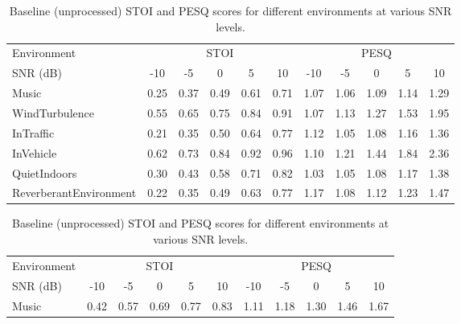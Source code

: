 \documentclass[logo,bsc,singlespacing,parskip,online]{infthesis}
\begin{document}
\begin{table}[h]
    \begin{subtable}{\textwidth}
    \centering
    \begin{tabular}{l|ccccc|ccccc}
       \toprule
       Environment & \multicolumn{5}{c|}{STOI} & \multicolumn{5}{c}{PESQ} \\
       \cmidrule(lr){2-6} \cmidrule(lr){7-11}
       SNR (dB) & -10 & -5 & 0 & 5 & 10 & -10 & -5 & 0 & 5 & 10 \\
       \midrule
       Music & \small{0.25} & \small{0.37} & \small{0.49} & \small{0.61} & \small{0.71} & \small{1.07} & \small{1.06} & \small{1.09} & \small{1.14} & \small{1.29} \\
       WindTurbulence & \small{0.55} & \small{0.65} & \small{0.75} & \small{0.84} & \small{0.91} & \small{1.07} & \small{1.13} & \small{1.27} & \small{1.53} & \small{1.95} \\
       InTraffic & \small{0.21} & \small{0.35} & \small{0.50} & \small{0.64} & \small{0.77} & \small{1.12} & \small{1.05} & \small{1.08} & \small{1.16} & \small{1.36} \\
       InVehicle & \small{0.62} & \small{0.73} & \small{0.84} & \small{0.92} & \small{0.96} & \small{1.10} & \small{1.21} & \small{1.44} & \small{1.84} & \small{2.36} \\
       QuietIndoors & \small{0.30} & \small{0.43} & \small{0.58} & \small{0.71} & \small{0.82} & \small{1.03} & \small{1.05} & \small{1.08} & \small{1.17} & \small{1.38} \\
       ReverberantEnvironment & \small{0.22} & \small{0.35} & \small{0.49} & \small{0.63} & \small{0.77} & \small{1.17} & \small{1.08} & \small{1.12} & \small{1.23} & \small{1.47} \\
       \bottomrule
    \end{tabular}
    \caption{Baseline (unprocessed) STOI and PESQ scores for different environments at various SNR levels.}
    \label{tab:hear-ds-baseline}
    \end{subtable}
    \begin{subtable}{\textwidth}
    \centering
    \begin{tabular}{l|ccccc|ccccc}
       \toprule
       Environment & \multicolumn{5}{c|}{STOI} & \multicolumn{5}{c}{PESQ} \\
       \cmidrule(lr){2-6} \cmidrule(lr){7-11}
       SNR (dB) & -10 & -5 & 0 & 5 & 10 & -10 & -5 & 0 & 5 & 10 \\
       \midrule
       Music & \small{0.42} & \small{0.57} & \small{0.69} & \small{0.77} & \small{0.83} & \small{1.11} & \small{1.18} & \small{1.30} & \small{1.46} & \small{1.67} \\

\end{tabular}
\end{subtable}
\end{table}
\end{document}
